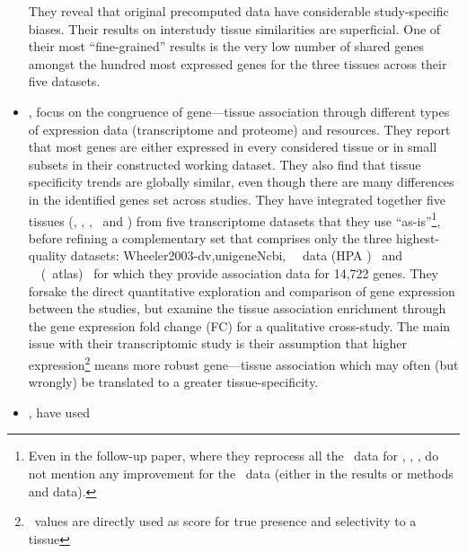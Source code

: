 \begin{itemize}[topsep=0pt,nosep]
They reveal that original precomputed data have considerable study-specific biases.
Their results on interstudy tissue similarities are superficial.
One of their most \enquote{fine-grained} results is the very low number of shared
genes amongst the hundred most expressed genes
for the three tissues across their five datasets.\mybr\
\item\hspace{-1mm}, focus on the congruence of gene---tissue association
through different types of expression data (transcriptome and proteome)
and resources.
They report that most genes are either expressed in every
considered tissue or in small subsets in their constructed working dataset.
They also find that tissue specificity trends are globally similar,
even though there are many differences in the identified genes set across studies.
They have integrated together five tissues
(\heart, \kidney, \liver, \nervous\ and \intestine)
from five transcriptome datasets that they use \enquote{as-is}\footnote{%
Even in the follow-up paper,
where they reprocess all the \Rnaseq\ data
for , , ,
\citet{Palasca2018-fh} do not mention any improvement for the  \Rnaseq\
data (either in the results or methods and data).},
before refining a complementary set that comprises only the three highest-quality
datasets: %
{Wheeler2003-dv,unigeneNcbi}, \uhlen\ \etal\ data (HPA \Rnaseq)~
and \castle\ \etal\ (\Rnaseq\ atlas)~\mycite{Krupp2012} for which they provide
association data for 14,722 genes.
They forsake the direct quantitative exploration and comparison of gene expression
between the studies,
but examine the tissue association enrichment
through the gene expression fold change (FC) for a qualitative cross-study.
The main issue with their transcriptomic study is their
assumption that higher expression\footnote{\FPKM\ values are directly
used as score for true presence and selectivity to a tissue} means
more robust gene---tissue association
which may often (but wrongly) be translated to a greater tissue-specificity.\mybr\
\item\hspace{-1mm}, have used

\end{itemize}
